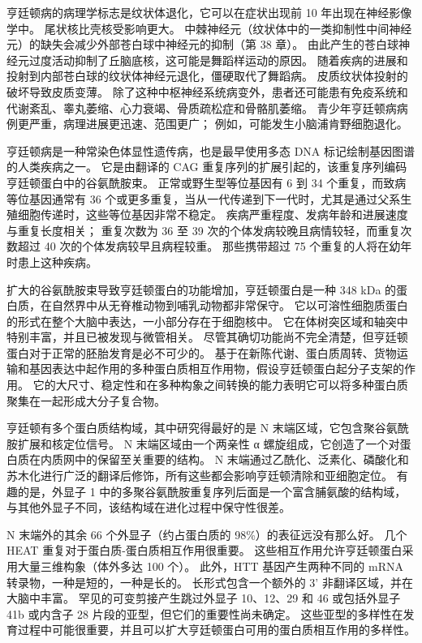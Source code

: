 亨廷顿病的病理学标志是纹状体退化，它可以在症状出现前 10 年出现在神经影像学中。 尾状核比壳核受影响更大。 中棘神经元（纹状体中的一类抑制性中间神经元）的缺失会减少外部苍白球中神经元的抑制（第 38 章）。 由此产生的苍白球神经元过度活动抑制了丘脑底核，这可能是舞蹈样运动的原因。 随着疾病的进展和投射到内部苍白球的纹状体神经元退化，僵硬取代了舞蹈病。 皮质纹状体投射的破坏导致皮质变薄。 除了这种中枢神经系统病变外，患者还可能患有免疫系统和代谢紊乱、睾丸萎缩、心力衰竭、骨质疏松症和骨骼肌萎缩。 青少年亨廷顿病病例更严重，病理进展更迅速、范围更广； 例如，可能发生小脑浦肯野细胞退化。

亨廷顿病是一种常染色体显性遗传病，也是最早使用多态 DNA 标记绘制基因图谱的人类疾病之一。 它是由翻译的 CAG 重复序列的扩展引起的，该重复序列编码亨廷顿蛋白中的谷氨酰胺束。 正常或野生型等位基因有 6 到 34 个重复，而致病等位基因通常有 36 个或更多重复，当从一代传递到下一代时，尤其是通过父系生殖细胞传递时，这些等位基因非常不稳定。 疾病严重程度、发病年龄和进展速度与重复长度相关； 重复次数为 36 至 39 次的个体发病较晚且病情较轻，而重复次数超过 40 次的个体发病较早且病程较重。 那些携带超过 75 个重复的人将在幼年时患上这种疾病。

扩大的谷氨酰胺束导致亨廷顿蛋白的功能增加，亨廷顿蛋白是一种 348 kDa 的蛋白质，在自然界中从无脊椎动物到哺乳动物都非常保守。 它以可溶性细胞质蛋白的形式在整个大脑中表达，一小部分存在于细胞核中。 它在体树突区域和轴突中特别丰富，并且已被发现与微管相关。 尽管其确切功能尚不完全清楚，但亨廷顿蛋白对于正常的胚胎发育是必不可少的。 基于在新陈代谢、蛋白质周转、货物运输和基因表达中起作用的多种蛋白质相互作用物，假设亨廷顿蛋白起分子支架的作用。 它的大尺寸、稳定性和在多种构象之间转换的能力表明它可以将多种蛋白质聚集在一起形成大分子复合物。

亨廷顿有多个蛋白质结构域，其中研究得最好的是 N 末端区域，它包含聚谷氨酰胺扩展和核定位信号。 N 末端区域由一个两亲性 α 螺旋组成，它创造了一个对蛋白质在内质网中的保留至关重要的结构。 N 末端通过乙酰化、泛素化、磷酸化和苏木化进行广泛的翻译后修饰，所有这些都会影响亨廷顿清除和亚细胞定位。 有趣的是，外显子 1 中的多聚谷氨酰胺重复序列后面是一个富含脯氨酸的结构域，与其他外显子不同，该结构域在进化过程中保守性很差。

N 末端外的其余 66 个外显子（约占蛋白质的 98\%）的表征远没有那么好。 几个 HEAT 重复对于蛋白质-蛋白质相互作用很重要。 这些相互作用允许亨廷顿蛋白采用大量三维构象（体外多达 100 个）。 此外，HTT 基因产生两种不同的 mRNA 转录物，一种是短的，一种是长的。 长形式包含一个额外的 3' 非翻译区域，并在大脑中丰富。 罕见的可变剪接产生跳过外显子 10、12、29 和 46 或包括外显子 41b 或内含子 28 片段的亚型，但它们的重要性尚未确定。 这些亚型的多样性在发育过程中可能很重要，并且可以扩大亨廷顿蛋白可用的蛋白质相互作用的多样性。


